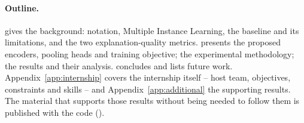 \paragraph{Outline.}
 gives the background: notation, Multiple Instance Learning, the \millet{}
baseline and its limitations, and the two explanation-quality metrics.  presents
the proposed encoders, pooling heads and training objective;  the experimental
methodology;  the results and  their analysis.
 concludes and lists future work. Appendix~\ref{app:internship} covers the
internship itself -- host team, objectives, constraints and skills -- and
Appendix~\ref{app:additional} the supporting results. The material that supports those results
without being needed to follow them is published with the code
().
